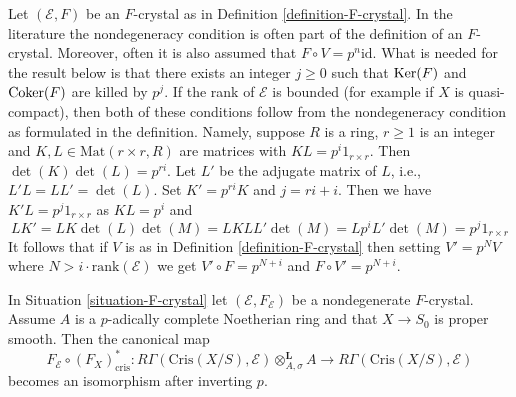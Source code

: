 \begin{remark}
\label{remark-F-crystal-variants}
Let $(\mathcal{E}, F)$ be an $F$-crystal as in
Definition \ref{definition-F-crystal}.
In the literature the nondegeneracy condition is often part of the
definition of an $F$-crystal. Moreover, often it is also assumed that
$F \circ V = p^n\text{id}$. What is needed for the result below is
that there exists an integer $j \geq 0$ such that $\mathop{\mathrm{Ker}}(F)$ and
$\mathop{\mathrm{Coker}}(F)$ are killed by $p^j$. If the rank of $\mathcal{E}$
is bounded (for example if $X$ is quasi-compact), then both of these
conditions follow from the nondegeneracy condition as formulated in
the definition. Namely, suppose $R$ is a ring, $r \geq 1$ is an integer and
$K, L \in \text{Mat}(r \times r, R)$ are matrices with
$K L = p^i 1_{r \times r}$. Then $\det(K)\det(L) = p^{ri}$. 
Let $L'$ be the adjugate matrix of $L$, i.e.,
$L' L = L L' = \det(L)$. Set $K' = p^{ri} K$ and $j = ri + i$.
Then we have $K' L = p^j 1_{r \times r}$ as $K L = p^i$ and
$$
L K' = L K \det(L) \det(M) = L K L L' \det(M) = L p^i L' \det(M) =
p^j 1_{r \times r}
$$
It follows that if $V$ is as in Definition \ref{definition-F-crystal}
then setting $V' = p^N V$ where $N > i \cdot \text{rank}(\mathcal{E})$
we get $V' \circ F = p^{N + i}$ and $F \circ V' = p^{N + i}$.
\end{remark}

\begin{theorem}
\label{theorem-cohomology-F-crystal}
In Situation \ref{situation-F-crystal} let $(\mathcal{E}, F_\mathcal{E})$
be a nondegenerate $F$-crystal. Assume $A$ is a $p$-adically complete
Noetherian ring and that $X \to S_0$ is proper smooth. Then
the canonical map
$$
F_\mathcal{E} \circ (F_X)_{\text{cris}}^* :
R\Gamma(\text{Cris}(X/S), \mathcal{E}) \otimes^\mathbf{L}_{A, \sigma} A
\longrightarrow
R\Gamma(\text{Cris}(X/S), \mathcal{E})
$$
becomes an isomorphism after inverting $p$.
\end{theorem}

